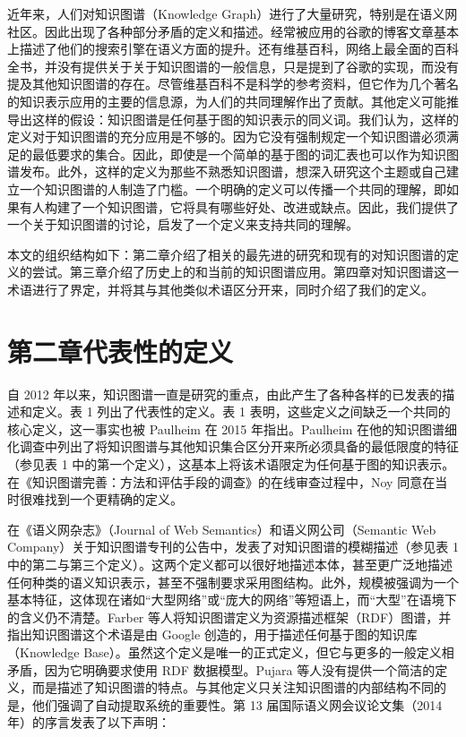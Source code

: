 \documentclass[a4paper,AutoFakeBold,oneside,12pt]{book}
\begin{document}
\begin{nopagenumber}
	近年来，人们对知识图谱（Knowledge Graph）进行了大量研究，特别是在语义网社区。因此出现了各种部分矛盾的定义和描述。经常被应用的谷歌的博客文章基本上描述了他们的搜索引擎在语义方面的提升。还有维基百科，网络上最全面的百科全书，并没有提供关于关于知识图谱的一般信息，只是提到了谷歌的实现，而没有提及其他知识图谱的存在。尽管维基百科不是科学的参考资料，但它作为几个著名的知识表示应用的主要的信息源，为人们的共同理解作出了贡献。其他定义可能推导出这样的假设：知识图谱是任何基于图的知识表示的同义词。我们认为，这样的定义对于知识图谱的充分应用是不够的。因为它没有强制规定一个知识图谱必须满足的最低要求的集合。因此，即使是一个简单的基于图的词汇表也可以作为知识图谱发布。此外，这样的定义为那些不熟悉知识图谱，想深入研究这个主题或自己建立一个知识图谱的人制造了门槛。一个明确的定义可以传播一个共同的理解，即如果有人构建了一个知识图谱，它将具有哪些好处、改进或缺点。因此，我们提供了一个关于知识图谱的讨论，启发了一个定义来支持共同的理解。

	本文的组织结构如下：第二章介绍了相关的最先进的研究和现有的对知识图谱的定义的尝试。第三章介绍了历史上的和当前的知识图谱应用。第四章对知识图谱这一术语进行了界定，并将其与其他类似术语区分开来，同时介绍了我们的定义。

	\newpage %
	\chapter*{第二章\quad{}代表性的定义}
	\newtranschapter

	自 2012 年以来，知识图谱一直是研究的重点，由此产生了各种各样的已发表的描述和定义。表 1 列出了代表性的定义。表 1 表明，这些定义之间缺乏一个共同的核心定义，这一事实也被 Paulheim 在 2015 年指出。Paulheim 在他的知识图谱细化调查中列出了将知识图谱与其他知识集合区分开来所必须具备的最低限度的特征（参见表 1 中的第一个定义），这基本上将该术语限定为任何基于图的知识表示。在《知识图谱完善：方法和评估手段的调查》的在线审查过程中，Noy 同意在当时很难找到一个更精确的定义。

	在《语义网杂志》（Journal of Web Semantics）和语义网公司（Semantic Web Company）关于知识图谱专刊的公告中，发表了对知识图谱的模糊描述（参见表 1 中的第二与第三个定义）。这两个定义都可以很好地描述本体，甚至更广泛地描述任何种类的语义知识表示，甚至不强制要求采用图结构。此外，规模被强调为一个基本特征，这体现在诸如“大型网络”或“庞大的网络”等短语上，而“大型”在语境下的含义仍不清楚。Farber 等人将知识图谱定义为资源描述框架（RDF）图谱，并指出知识图谱这个术语是由 Google 创造的，用于描述任何基于图的知识库（Knowledge Base）。虽然这个定义是唯一的正式定义，但它与更多的一般定义相矛盾，因为它明确要求使用 RDF 数据模型。Pujara 等人没有提供一个简洁的定义，而是描述了知识图谱的特点。与其他定义只关注知识图谱的内部结构不同的是，他们强调了自动提取系统的重要性。第 13 届国际语义网会议论文集（2014 年）的序言发表了以下声明：


\end{nopagenumber}
\end{document}

